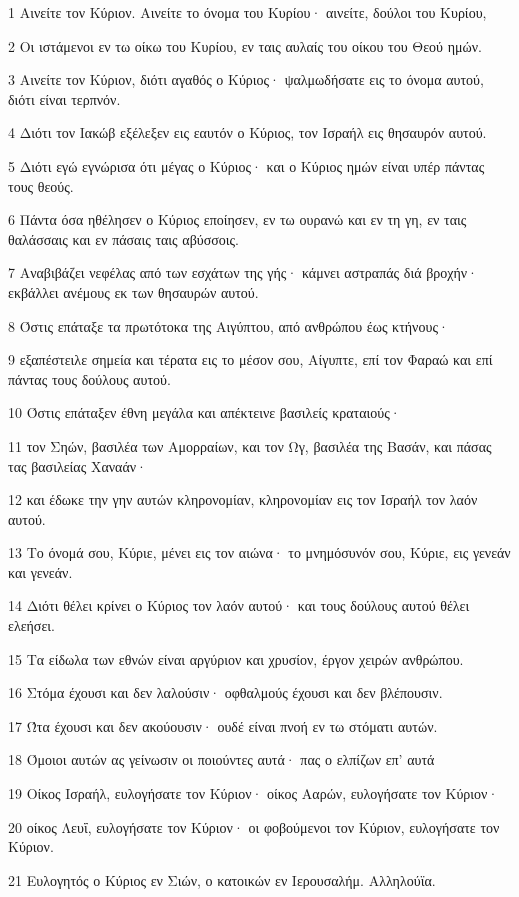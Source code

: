 \par 1 Αινείτε τον Κύριον. Αινείτε το όνομα του Κυρίου· αινείτε, δούλοι του Κυρίου,
\par 2 Οι ιστάμενοι εν τω οίκω του Κυρίου, εν ταις αυλαίς του οίκου του Θεού ημών.
\par 3 Αινείτε τον Κύριον, διότι αγαθός ο Κύριος· ψαλμωδήσατε εις το όνομα αυτού, διότι είναι τερπνόν.
\par 4 Διότι τον Ιακώβ εξέλεξεν εις εαυτόν ο Κύριος, τον Ισραήλ εις θησαυρόν αυτού.
\par 5 Διότι εγώ εγνώρισα ότι μέγας ο Κύριος· και ο Κύριος ημών είναι υπέρ πάντας τους θεούς.
\par 6 Πάντα όσα ηθέλησεν ο Κύριος εποίησεν, εν τω ουρανώ και εν τη γη, εν ταις θαλάσσαις και εν πάσαις ταις αβύσσοις.
\par 7 Αναβιβάζει νεφέλας από των εσχάτων της γής· κάμνει αστραπάς διά βροχήν· εκβάλλει ανέμους εκ των θησαυρών αυτού.
\par 8 Όστις επάταξε τα πρωτότοκα της Αιγύπτου, από ανθρώπου έως κτήνους·
\par 9 εξαπέστειλε σημεία και τέρατα εις το μέσον σου, Αίγυπτε, επί τον Φαραώ και επί πάντας τους δούλους αυτού.
\par 10 Όστις επάταξεν έθνη μεγάλα και απέκτεινε βασιλείς κραταιούς·
\par 11 τον Σηών, βασιλέα των Αμορραίων, και τον Ωγ, βασιλέα της Βασάν, και πάσας τας βασιλείας Χαναάν·
\par 12 και έδωκε την γην αυτών κληρονομίαν, κληρονομίαν εις τον Ισραήλ τον λαόν αυτού.
\par 13 Το όνομά σου, Κύριε, μένει εις τον αιώνα· το μνημόσυνόν σου, Κύριε, εις γενεάν και γενεάν.
\par 14 Διότι θέλει κρίνει ο Κύριος τον λαόν αυτού· και τους δούλους αυτού θέλει ελεήσει.
\par 15 Τα είδωλα των εθνών είναι αργύριον και χρυσίον, έργον χειρών ανθρώπου.
\par 16 Στόμα έχουσι και δεν λαλούσιν· οφθαλμούς έχουσι και δεν βλέπουσιν.
\par 17 Ώτα έχουσι και δεν ακούουσιν· ουδέ είναι πνοή εν τω στόματι αυτών.
\par 18 Όμοιοι αυτών ας γείνωσιν οι ποιούντες αυτά· πας ο ελπίζων επ' αυτά
\par 19 Οίκος Ισραήλ, ευλογήσατε τον Κύριον· οίκος Ααρών, ευλογήσατε τον Κύριον·
\par 20 οίκος Λευΐ, ευλογήσατε τον Κύριον· οι φοβούμενοι τον Κύριον, ευλογήσατε τον Κύριον.
\par 21 Ευλογητός ο Κύριος εν Σιών, ο κατοικών εν Ιερουσαλήμ. Αλληλούϊα.

